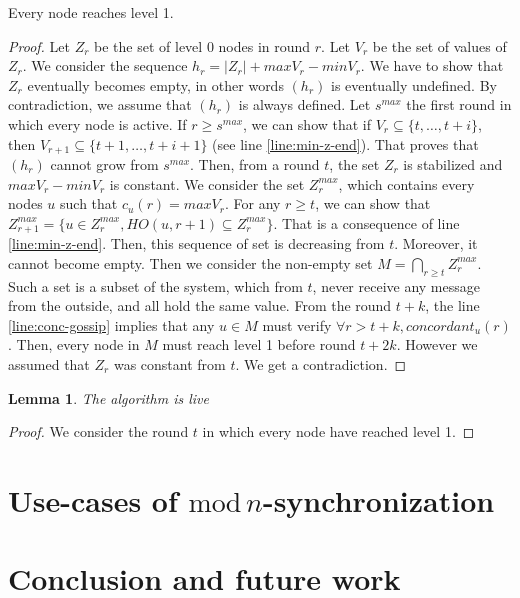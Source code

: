 \documentclass[11pt,letterpaper]{article}
\renewcommand{\geq}{\geqslant}
\newtheorem{lem}[thm]{Lemma}
\begin{document}
\begin{lemma}
	Every node reaches level 1.
\end{lemma}
\begin{proof}
	Let $Z_r$ be the set of level 0 nodes in round $r$.
	Let $V_r$ be the set of values of $Z_r$.
	We consider the sequence $h_r = |Z_r| + max V_r - min V_r$.
	We have to show that $Z_r$ eventually becomes empty, in other words $(h_r)$ is eventually undefined.
	By contradiction, we assume that $(h_r)$ is always defined.
	Let $s^{max}$ the first round in which every node is active.
	If $r \geq s^{max}$, we can show that if $V_r \subseteq \{t, \dots, t+i\}$, then $V_{r+1} \subseteq \{t+1, \dots , t+i+1\}$ (see line \ref{line:min-z-end}).
	That proves that $(h_r)$ cannot grow from $s^{max}$.
	Then, from a round $t$, the set $Z_r$ is stabilized and $max V_r - min V_r$ is constant.
	We consider the set $Z_r^{max}$, which contains every nodes $u$ such that $c_u(r) = max V_r$.
	For any $r \geq t$, we can show that $Z_{r+1}^{max} = \{u \in Z_r^{max}, HO(u, r+1) \subseteq Z_r^{max}\}$. That is a consequence of line \ref{line:min-z-end}.
	Then, this sequence of set is decreasing from $t$. Moreover, it cannot become empty. Then we consider the non-empty set $M = \bigcap\limits_{r \geq t} Z_r^{max}$.
	Such a set is a subset of the system, which from $t$, never receive any message from the outside, and all hold the same value.
	From the round $t+k$, the line \ref{line:conc-gossip} implies that any $u \in M$ must verify $\forall r > t+k, concordant_u(r)$.
	Then, every node in $M$ must reach level 1 before round $t+2k$.
	However we assumed that $Z_r$ was constant from $t$. We get a contradiction.
\end{proof}

\begin{lem}
	The algorithm is live
\end{lem}
\begin{proof}
	We consider the round $t$ in which every node have reached level 1.
\end{proof}

\section{Use-cases of $\mathrm{mod}\,n$-synchronization}

\section{Conclusion and future work}


\printbibliography
\end{document}
